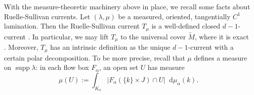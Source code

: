 \documentclass[final,12pt, leqno]{brownthesis}
\newcommand{\RR}{\mathbf{R}}
\DeclareMathOperator{\Lip}{Lip}
\DeclareMathOperator{\supp}{supp}
\newcommand*\dif{\mathop{}\!\mathrm{d}}
\DeclareMathOperator{\dist}{dist}
\newtheorem{proposition}[theorem]{Proposition}
\theoremstyle{definition}
\numberwithin{equation}{section}
\begin{document}

With the measure-theoretic machinery above in place, we recall some facts about Ruelle-Sullivan currents.
Let $(\lambda, \mu)$ be a measured, oriented, tangentially $C^1$ lamination.
Then the Ruelle-Sullivan current $T_\mu$ is a well-defined closed $d-1$-current \cite[Theorem 8.2]{daskalopoulos2020transverse}. 
In particular, we may lift $T_\mu$ to the universal cover $\tilde M$, where it is exact \cite[Theorem 8.3]{daskalopoulos2020transverse}.
Moreover, $T_\mu$ has an intrinsic definition as the unique $d-1$-current with a certain polar decomposition.
To be more precise, recall that $\mu$ defines a measure on $\supp \lambda$: in each flow box $F_\alpha$, an open set $U$ has measure
\begin{equation}\label{transverse measure of an open set}
\mu(U) := \int_{K_\alpha} |F_\alpha(\{k\} \times J) \cap U| \dif \mu_\alpha(k).
\end{equation}

\end{document}
